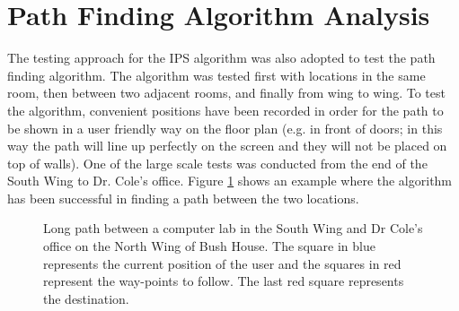 \section{Path Finding Algorithm Analysis}
\label{sec:nav-analysis}
The testing approach for the IPS algorithm was also adopted to test the path finding algorithm. The algorithm was tested first with locations in the same room, then between two adjacent rooms, and finally from wing to wing. To test the algorithm, convenient positions have been recorded in order for the path to be shown in a user friendly way on the floor plan (e.g. in front of doors; in this way the path will line up perfectly on the screen and they will not be placed on top of walls). One of the large scale tests was conducted from the end of the South Wing to Dr. Cole's office. Figure \ref{fig:nav-long-path} shows an example where the algorithm has been successful in finding a path between the two locations.

\begin{figure}[H]
    \centering
    \caption{Long path between a computer lab in the South Wing and Dr Cole's office on the North Wing of Bush House. The square in blue represents the current position of the user and the squares in red represent the way-points to follow. The last red square represents the destination.}
    \label{fig:nav-long-path}
\end{figure}

